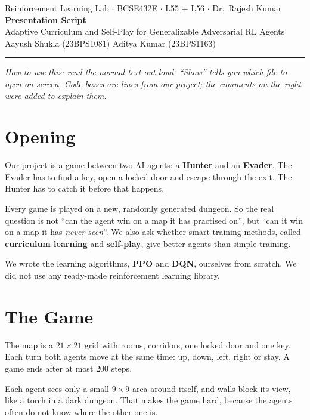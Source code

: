 \documentclass[11pt,a4paper]{article}
\begin{document}
\begin{center}
{\large Reinforcement Learning Lab \;$\cdot$\; BCSE432E \;$\cdot$\; L55 + L56 \;$\cdot$\; Dr.\ Rajesh Kumar}\\[8pt]
{\LARGE\bfseries Presentation Script}\\[4pt]
{\large Adaptive Curriculum and Self-Play for Generalizable Adversarial RL Agents}\\[6pt]
Aayush Shukla (23BPS1081) \quad Aditya Kumar (23BPS1163)
\end{center}

\noindent\rule{\textwidth}{0.4pt}

\textit{How to use this: read the normal text out loud. ``Show'' tells you which file to open
on screen. Code boxes are lines from our project; the comments on the right were added to
explain them.}

\section{Opening}
Our project is a game between two AI agents: a \textbf{Hunter} and an \textbf{Evader}.
The Evader has to find a key, open a locked door and escape through the exit. The Hunter has to
catch it before that happens.

Every game is played on a new, randomly generated dungeon. So the real question is not
``can the agent win on a map it has practised on'', but ``can it win on a map it has
\emph{never seen}''. We also ask whether smart training methods, called \textbf{curriculum
learning} and \textbf{self-play}, give better agents than simple training.

We wrote the learning algorithms, \textbf{PPO} and \textbf{DQN}, ourselves from scratch. We did not
use any ready-made reinforcement learning library.

\section{The Game}
The map is a $21\times21$ grid with rooms, corridors, one locked door and one key. Each turn both
agents move at the same time: up, down, left, right or stay. A game ends after at most 200 steps.

Each agent sees only a small $9\times9$ area around itself, and walls block its view, like a
torch in a dark dungeon. That makes the game hard, because the agents often do not know where
the other one is.
\end{document}
